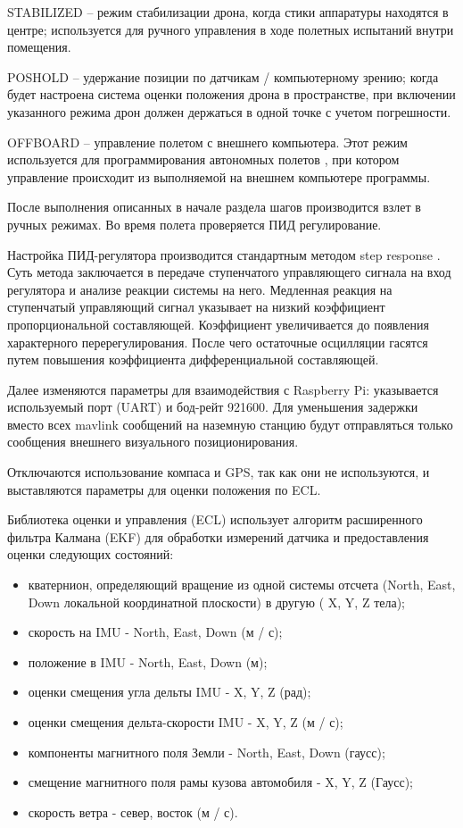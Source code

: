 STABILIZED -- режим стабилизации дрона, когда стики аппаратуры находятся в центре; используется для ручного управления в ходе полетных испытаний внутри помещения.

POSHOLD -- удержание позиции по датчикам / компьютерному зрению; когда будет настроена система оценки положения дрона в пространстве, при включении указанного режима дрон должен держаться в одной точке с учетом погрешности.

OFFBOARD -- управление полетом с внешнего компьютера. Этот режим используется для программирования автономных полетов \cite{clover}, при котором управление происходит из выполняемой на внешнем компьютере программы.

После выполнения описанных в начале раздела шагов производится взлет в ручных режимах. Во время полета проверяется ПИД регулирование.

Настройка ПИД-регулятора производится стандартным методом step res\-ponse \cite{tau}. Суть метода заключается в передаче ступенчатого управляющего сигнала на вход регулятора и анализе реакции системы на него.
Медленная реакция на ступенчатый управляющий сигнал указывает на низкий коэффициент пропорциональной составляющей.
Коэффициент увеличивается до появления характерного перерегулирования.
После чего остаточные осцилляции гасятся путем повышения коэффициента дифференциальной составляющей.

Далее изменяются параметры для взаимодействия с Raspberry Pi: указывается используемый порт (UART) и бод-рейт 921600.
Для уменьшения задержки вместо всех mavlink сообщений на наземную станцию будут отправляться только сообщения внешнего визуального позиционирования.

Отключаются использование компаса и GPS, так как они не используются, и выставляются параметры для оценки положения по ECL.

Библиотека оценки и управления (ECL) использует алгоритм расширенного фильтра Калмана (EKF) для обработки измерений датчика и предоставления оценки следующих состояний:
\begin{itemize}
	\item кватернион, определяющий вращение из одной системы отсчета (North, East, Down локальной координатной плоскости) в другую ( X, Y, Z тела);
	\item скорость на IMU - North, East, Down (м / с);
	\item положение в IMU - North, East, Down (м);
	\item оценки смещения угла дельты IMU - X, Y, Z (рад);
	\item оценки смещения дельта-скорости IMU - X, Y, Z (м / с);
	\item компоненты магнитного поля Земли - North, East, Down (гаусс);
	\item смещение магнитного поля рамы кузова автомобиля - X, Y, Z (Гаусс);
	\item скорость ветра - север, восток (м / с).
\end{itemize}

